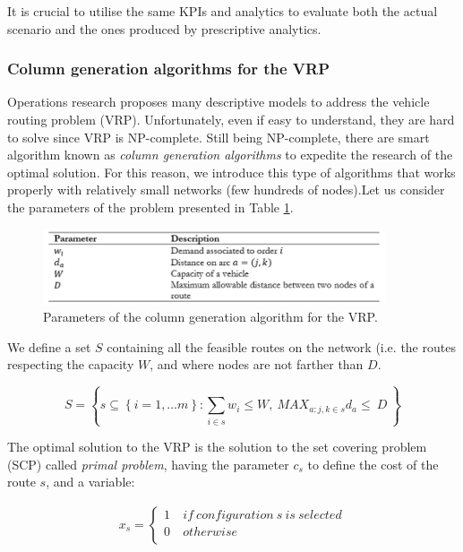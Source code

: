 It is crucial to utilise the same KPIs and analytics to evaluate both the actual scenario and the ones produced by prescriptive analytics.

\subsubsection{Column generation algorithms for the VRP}

Operations research proposes many descriptive models to address the vehicle routing problem (VRP). Unfortunately, even if easy to understand, they are hard to solve since VRP is NP-complete. Still being NP-complete, there are smart algorithm known as \textit{column generation algorithms} to expedite the research of the optimal solution. For this reason, we introduce this type of algorithms that works properly with relatively small networks (few hundreds of nodes).Let us consider the parameters of the problem presented in Table \ref{tab_VRP_colgen}.

\begin{figure}[hbt!]
\centering
\includegraphics[width=0.9\textwidth]{SectionDistribution/control_figures/tab_VRP_colgen.png}
\captionsetup{type=table}
\caption{Parameters of the column generation algorithm for the VRP.}
\label{tab_VRP_colgen}
\end{figure}

We define a set $S$ containing all the feasible routes on the network (i.e. the routes respecting the capacity $W$, and where nodes are not farther than $D$.

\begin{equation}
    S=\left\{s\subseteq\left\{i=1,\ldots m\right\}:\sum_{i\in s}{w_i\le W},\ {MAX_{a:j,k\in s}{d}_a\le\ D}\ \right\}
\end{equation}

The optimal solution to the VRP is the solution to the set covering problem (SCP) called \textit{primal problem}, having the parameter $c_s$ to define the cost of the route $s$, and a variable:

\begin{equation}
   \begin{split}
   x_s=\left\{
                \begin{array}{ll}
                  1\ & if\ configuration\ s\ is\ selected\\
                  0 & otherwise\\
                \end{array}
              \right.
   \end{split}
\end{equation}


